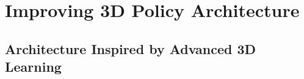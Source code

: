 \documentclass[runningheads]{llncs}
\begin{document}
\section{Improving 3D Policy Architecture}
\label{sec:architecture}
\subsection{Architecture Inspired by Advanced 3D Learning}

     
\end{document}
